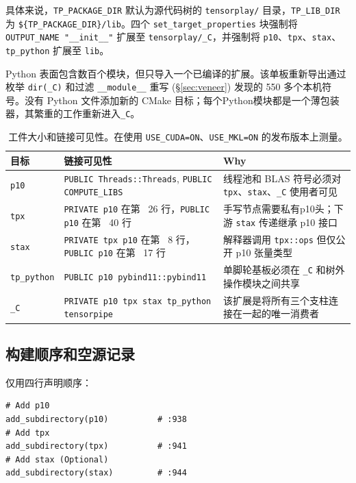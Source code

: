 具体来说，\texttt{TP\_PACKAGE\_DIR} 默认为源代码树的 \texttt{tensorplay/} 目录，\texttt{TP\_LIB\_DIR} 为 \texttt{\$\{TP\_PACKAGE\_DIR\}/lib}。四个 \texttt{set\_target\_properties} 块强制将 \texttt{OUTPUT\_NAME "\_\_init\_\_"} 扩展至 \texttt{tensorplay/\_C}，并强制将 \texttt{p10}、\texttt{tpx}、\texttt{stax}、\texttt{tp\_python} 扩展至 \texttt{lib}。

Python 表面包含数百个模块，但只导入一个已编译的扩展。该单板重新导出通过枚举 \texttt{dir(\_C)} 和过滤 \texttt{\_\_module\_\_} 重写 (\S\ref{sec:veneer}) 发现的 550 多个本机符号。没有 Python 文件添加新的 CMake 目标；每个Python模块都是一个薄包装器，其繁重的工作重新进入\texttt{\_C}。

\begin{table}[H]
\centering
\caption{工件大小和链接可见性。在使用 \texttt{USE\_CUDA=ON}、\texttt{USE\_MKL=ON} 的发布版本上测量。}
\label{tab:artifactsizes}
\small
\begin{tabular}{lll}
\toprule
目标 & 链接可见性 & Why \\
\midrule
\texttt{p10} & \texttt{PUBLIC Threads::Threads}, \texttt{PUBLIC COMPUTE\_LIBS} & 线程池和 BLAS 符号必须对 \texttt{tpx}、\texttt{stax}、\texttt{\_C} 使用者可见 \\
\texttt{tpx} & \texttt{PRIVATE p10} 在第 ~26 行，\texttt{PUBLIC p10} 在第 ~40 行 & 手写节点需要私有p10头；下游 \texttt{stax} 传递继承 p10 接口 \\
\texttt{stax} & \texttt{PRIVATE tpx p10} 在第 ~8 行，\texttt{PUBLIC p10} 在第 ~17 行 & 解释器调用 \texttt{tpx::ops} 但仅公开 p10 张量类型 \\
\texttt{tp\_python} & \texttt{PUBLIC p10 pybind11::pybind11} & 单脚轮基板必须在 \texttt{\_C} 和树外操作模块之间共享 \\
\texttt{\_C} & \texttt{PRIVATE p10 tpx stax tp\_python tensorpipe} & 该扩展是将所有三个支柱连接在一起的唯一消费者 \\
\bottomrule
\end{tabular}
\end{table}

\subsection{构建顺序和空源记录}
\label{sec:arch:buildorder}

仅用四行声明顺序：

\begin{lstlisting}[caption={pillar order is load-bearing.}, label=lst:buildorder]
# Add p10
add_subdirectory(p10)          # :938
# Add tpx
add_subdirectory(tpx)          # :941
# Add stax (Optional)
add_subdirectory(stax)         # :944
\end{lstlisting}

